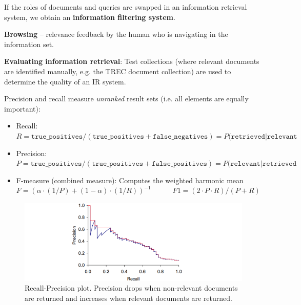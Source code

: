     If the roles of documents and queries are swapped in an information retrieval system, we obtain an \textbf{information filtering system}.

    \textbf{Browsing} -- relevance feedback by the human who is navigating in the information set.

    \textbf{Evaluating information retrieval}: Test collections (where relevant documents are identified manually, e.g. the TREC document collection) are used to determine the quality of an IR system.

    Precision and recall measure \emph{unranked} result sets (i.e. all elements are equally important):
    \begin{itemize}
      \item Recall: $R = \texttt{true\_positives}/(\texttt{true\_positives}+\texttt{false\_negatives})=P(\texttt{retrieved}|\texttt{relevant}$
      \item Precision: $P = \texttt{true\_positives}/(\texttt{true\_positives}+\texttt{false\_positives})=P(\texttt{relevant}|\texttt{retrieved}$
      \item F-measure (combined measure): Computes the weighted harmonic mean\\
      $F=(\alpha\cdot(1/P)+(1-\alpha)\cdot(1/R))^{-1}\qquad\quad F1=(2\cdot P\cdot R)/(P+R)$
    \end{itemize}
\newpage
    \begin{figure}[htp]
      \centering
        \includegraphics[width=\textwidth]{images/rrplot1.png}
        \caption{Recall-Precision plot. Precision drops when non-relevant documents are returned and increases when relevant documents are returned.}
        \label{fig:rrplot1}
    \end{figure}

